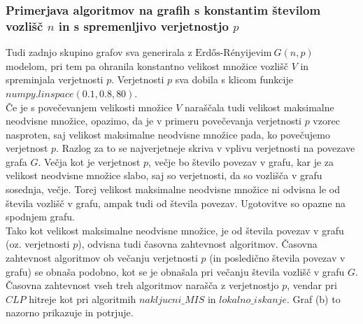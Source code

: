\documentclass[a4paper, 12pt]{article}
\begin{document}
\subsubsection{Primerjava algoritmov na grafih s konstantim številom vozlišč $n$ in s spremenljivo verjetnostjo $p$}

Tudi zadnjo skupino grafov sva generirala z $\text{Erdős-Rényijevim}\ G(n, p)$ modelom, pri tem pa ohranila konstantno velikost množice vozlišč $V$ in spreminjala verjetnosti $p$.
Verjetnosti $p$ sva dobila s klicom funkcije $numpy.linspace(0.1, 0.8, 80)$.\\

\noindent Če je s povečevanjem velikosti množice $V$ naraščala tudi velikost maksimalne neodvisne množice, opazimo, da je v primeru povečevanja verjetnosti $p$ vzorec nasproten, saj
velikost maksimalne neodvisne množice pada, ko povečujemo verjetnost $p$. Razlog za to se najverjetneje skriva v vplivu verjetnosti na povezave grafa $G$. 
Večja kot je verjetnost $p$, večje bo število povezav v grafu, kar je za velikost neodvisne množice slabo, saj so verjetnosti, da so vozlišča v grafu sosednja, večje. 
Torej velikost maksimalne neodvisne množice ni odvisna le od števila vozlišč v grafu, ampak tudi od števila povezav. Ugotovitve so opazne na spodnjem grafu.\\



\noindent Tako kot velikost maksimalne neodvisne množice, je od števila povezav v grafu (oz. verjetnosti $p$), odvisna tudi časovna zahtevnost algoritmov. Časovna zahtevnost algoritmov ob večanju verjetnosti $p$ 
(in posledično števila povezav v grafu) se obnaša podobno, kot se je obnašala pri večanju števila vozlišč v grafu $G$. Časovna zahtevnost vseh treh algoritmov narašča z verjetnostjo $p$, vendar pri $CLP$ hitreje kot pri algoritmih
$nakljucni\_MIS$ in $lokalno\_iskanje$. Graf (b) to nazorno prikazuje in potrjuje.
\end{document}
